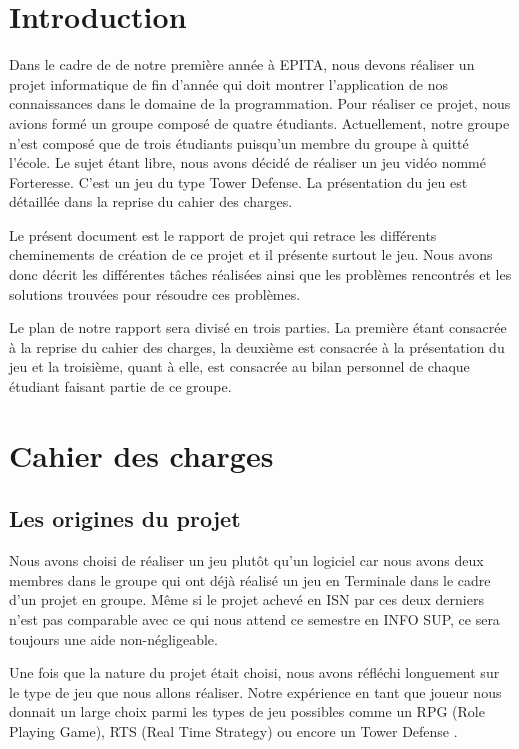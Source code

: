 \documentclass[a4paper, 12pt]{article}
\begin{document}
\begin{spacing}{1.0}
	\tableofcontents
\end{spacing}

\newpage
\section{Introduction}
Dans le cadre de de notre première année à EPITA, nous devons réaliser un projet informatique de fin d’année qui doit montrer l’application de nos connaissances dans le domaine de la programmation. Pour réaliser ce projet, nous avions formé un groupe composé de quatre étudiants. Actuellement, notre groupe n’est composé que de trois étudiants puisqu’un membre du groupe à quitté l’école.  
Le sujet étant libre, nous avons décidé de réaliser un jeu vidéo nommé Forteresse. C’est un jeu du type Tower Defense. La présentation du jeu est détaillée dans la reprise du cahier des charges.  
	\par Le présent document est  le rapport de projet  qui retrace les différents cheminements de création de ce projet  et il présente surtout le jeu.  Nous avons donc décrit les différentes tâches réalisées ainsi que les problèmes rencontrés et les solutions trouvées pour résoudre ces problèmes.
	\par Le plan de notre rapport sera divisé en trois parties. La première étant consacrée à la reprise du cahier des charges, la deuxième est consacrée à la présentation du jeu et la troisième, quant à elle, est consacrée au bilan personnel de chaque étudiant faisant partie de ce groupe.


\newpage
\section{Cahier des charges}
\subsection{Les origines du projet}
Nous avons choisi de réaliser un jeu plutôt qu’un logiciel car nous avons deux membres dans le groupe qui ont déjà réalisé un jeu en Terminale dans le cadre d’un projet en groupe. Même si le projet achevé en ISN par ces deux derniers n’est pas comparable avec ce qui nous attend ce semestre en INFO SUP, ce sera toujours une aide non-négligeable.
\par Une fois que la nature du projet était choisi, nous avons réfléchi longuement sur le type de jeu que nous allons réaliser. Notre expérience en tant que joueur nous donnait un large choix parmi les types de jeu possibles comme un RPG (Role Playing Game), RTS (Real Time Strategy) ou encore un Tower Defense . 
\end{document}
